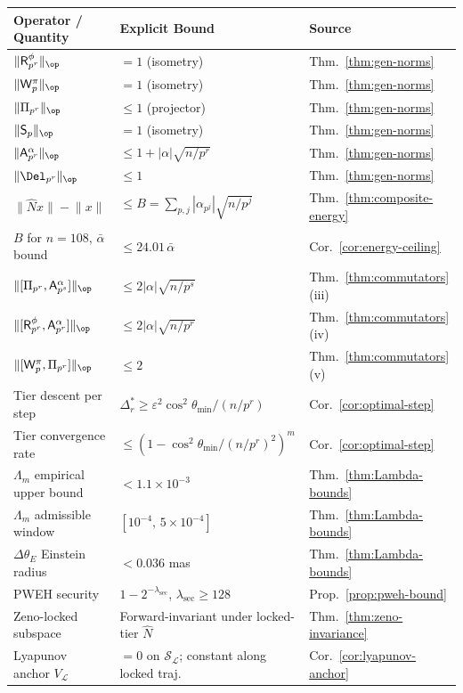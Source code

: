 \documentclass[11pt]{amsart}
\newcommand{\Prj}{\Pi}
\newcommand{\Sp}{\mathsf{S}}
\newcommand{\Ap}{\mathsf{A}}
\newcommand{\Rp}{\mathsf{R}}
\newcommand{\Wp}{\mathsf{W}}
\newcommand{\bN}{\widehat{N}}
\newcommand{\norm}[1]{\lVert #1 \rVert}
\begin{document}
\begin{center}
\renewcommand{\arraystretch}{1.4}
\begin{tabular}{p{4.2cm}p{5.8cm}p{3.5cm}}
\toprule
\textbf{Operator / Quantity} & \textbf{Explicit Bound} & \textbf{Source} \\
\midrule
$\norm{\Rp^\phi_{p^r}}_\op$ & $= 1$ (isometry) & Thm.~\ref{thm:gen-norms} \\
$\norm{\Wp^\pi_p}_\op$ & $= 1$ (isometry) & Thm.~\ref{thm:gen-norms} \\
$\norm{\Prj_{p^r}}_\op$ & $\leq 1$ (projector) & Thm.~\ref{thm:gen-norms} \\
$\norm{\Sp_p}_\op$ & $= 1$ (isometry) & Thm.~\ref{thm:gen-norms} \\
$\norm{\Ap^\alpha_{p^r}}_\op$ & $\leq 1 + |\alpha|\sqrt{n/p^r}$ & Thm.~\ref{thm:gen-norms} \\
$\norm{\Del_{p^r}}_\op$ & $\leq 1$ & Thm.~\ref{thm:gen-norms} \\
$\norm{\bN x} - \norm{x}$ & $\leq B = \sum_{p,j}|\alpha_{p^j}|\sqrt{n/p^j}$ & Thm.~\ref{thm:composite-energy} \\
$B$ for $n = 108$, $\bar\alpha$ bound & $\leq 24.01\,\bar\alpha$ & Cor.~\ref{cor:energy-ceiling} \\
$\norm{[\Prj_{p^r}, \Ap^\alpha_{p^s}]}_\op$ & $\leq 2|\alpha|\sqrt{n/p^s}$ & Thm.~\ref{thm:commutators}(iii) \\
$\norm{[\Rp^\phi_{p^r}, \Ap^\alpha_{p^r}]}_\op$ & $\leq 2|\alpha|\sqrt{n/p^r}$ & Thm.~\ref{thm:commutators}(iv) \\
$\norm{[\Wp^\pi_p, \Prj_{p^r}]}_\op$ & $\leq 2$ & Thm.~\ref{thm:commutators}(v) \\
Tier descent per step & $\Delta_r^* \geq \varepsilon^2\cos^2\theta_{\min}/(n/p^r)$ & Cor.~\ref{cor:optimal-step} \\
Tier convergence rate & $\leq (1 - \cos^2\theta_{\min}/(n/p^r)^2)^m$ & Cor.~\ref{cor:optimal-step} \\
$\Lambda_m$ empirical upper bound & $< 1.1 \times 10^{-3}$ & Thm.~\ref{thm:Lambda-bounds} \\
$\Lambda_m$ admissible window & $[10^{-4},\, 5\times10^{-4}]$ & Thm.~\ref{thm:Lambda-bounds} \\
$\Delta\theta_E$ Einstein radius & $< 0.036$ mas & Thm.~\ref{thm:Lambda-bounds} \\
PWEH security & $1 - 2^{-\lambda_{\mathrm{sec}}}$, $\lambda_{\mathrm{sec}} \geq 128$ & Prop.~\ref{prop:pweh-bound} \\
Zeno-locked subspace & Forward-invariant under locked-tier $\bN$ & Thm.~\ref{thm:zeno-invariance} \\
Lyapunov anchor $V_\mathcal{L}$ & $= 0$ on $\mathcal{S}_\mathcal{L}$; constant along locked traj. & Cor.~\ref{cor:lyapunov-anchor} \\
\bottomrule
\end{tabular}
\end{center}
\end{document}
